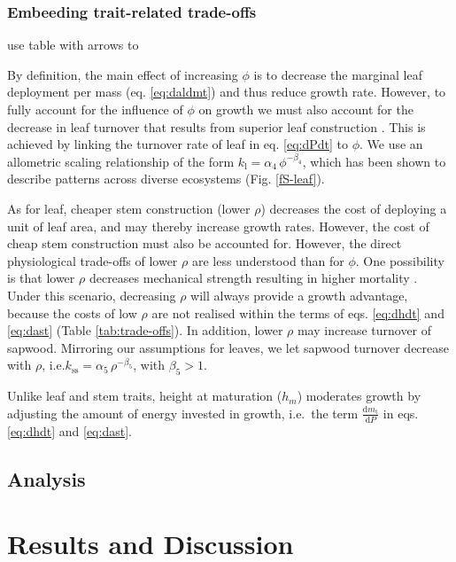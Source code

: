 \documentclass[12pt, a4paper]{article}
\begin{document}
\subsubsection{Embeeding trait-related trade-offs}

use table with arrows to



By definition, the main effect of increasing $\phi$ is to decrease the
marginal leaf deployment per mass (eq. \ref{eq:daldmt}) and thus reduce
growth rate. However, to fully account for the influence of $\phi$ on
growth we must also account for the decrease in leaf turnover that
results from superior leaf construction \citep{wright_world-2004}.
This is achieved by linking the turnover rate of leaf in eq.
\ref{eq:dPdt} to $\phi$. We use an allometric scaling relationship of
the form $k_\textrm{l}=\alpha_4 \, \phi^{-\beta_4}$, which has been
shown to describe patterns across diverse
ecosystems \citep{wright_world-2004} (Fig. \ref{fS-leaf}).

As for leaf, cheaper stem construction (lower $\rho$) decreases the
cost of deploying a unit of leaf area, and may thereby increase growth
rates. However, the cost of cheap stem construction must also be
accounted for. However, the direct physiological trade-offs of lower
$\rho$ are less understood than for $\phi$. One possibility is that
lower $\rho$ decreases mechanical strength resulting in higher
mortality \citep{chave-2009,wright-2010}. Under
this scenario, decreasing $\rho$ will always provide a growth
advantage, because the costs of low $\rho$ are not realised within the
terms of eqs. \ref{eq:dhdt} and \ref{eq:dast} (Table
\ref{tab:trade-offs}). In addition, lower $\rho$ may increase turnover
of sapwood. Mirroring our assumptions for leaves, we let sapwood
turnover decrease with $\rho$,
i.e.$k_\textrm{ss}=\alpha_5 \, \rho^{-\beta_5}$, with $\beta_5 > 1$.

Unlike leaf and stem traits, height at maturation ($h_m$) moderates
growth by adjusting the amount of energy invested in growth, i.e.~the
term $\frac{\textrm{d}m_\textrm{t}}{\textrm{d}P}$ in eqs.
\ref{eq:dhdt} and \ref{eq:dast}.

\subsection{Analysis}\label{analysis}



\newpage
\section{Results and Discussion}\label{results}
\end{document}
